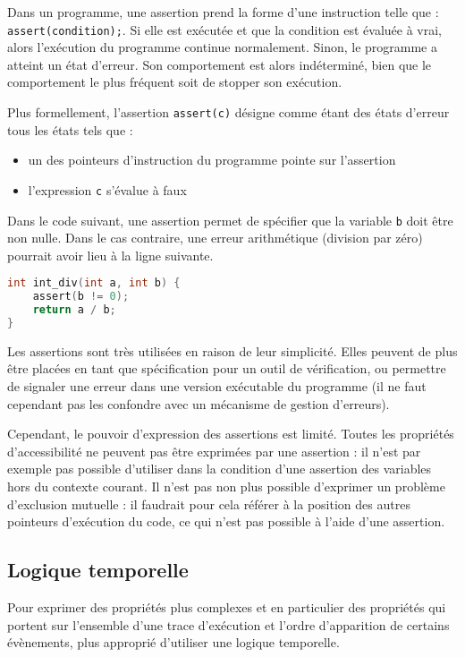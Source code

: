 Dans un programme, une assertion prend la forme d'une instruction telle que :\\
\texttt{assert(condition);}.
Si elle est exécutée et que la condition est évaluée à vrai, alors l'exécution
du programme continue normalement.
Sinon, le programme a atteint un état d'erreur. Son comportement est alors
indéterminé, bien que le comportement le plus fréquent soit de stopper son
exécution.

Plus formellement, l'assertion \texttt{assert(c)} désigne comme étant des
états d'erreur tous les états tels que :

\begin{itemize}
\item
  un des pointeurs d'instruction du programme pointe sur l'assertion
\item
  l'expression \texttt{c} s'évalue à faux
\end{itemize}

Dans le code suivant, une assertion permet de spécifier que la variable
\texttt{b} doit être non nulle. Dans le cas contraire, une erreur
arithmétique (division par zéro) pourrait avoir lieu à la ligne suivante.

\begin{lstlisting}[language=C, frame=single]
int int_div(int a, int b) {
    assert(b != 0);
    return a / b;
}
\end{lstlisting}

Les assertions sont très utilisées en raison de leur simplicité.
Elles peuvent de plus être placées en tant que spécification pour un outil de
vérification, ou permettre de signaler une erreur dans une version exécutable
du programme (il ne faut cependant pas les confondre avec un mécanisme de
gestion d'erreurs).

Cependant, le pouvoir d'expression des assertions est limité. Toutes les
propriétés d'accessibilité ne peuvent pas être exprimées par une assertion : il
n'est par exemple pas possible d'utiliser dans la condition d'une assertion des
variables hors du contexte courant. Il n'est pas non plus possible d'exprimer un
problème d'exclusion mutuelle : il faudrait pour cela référer à la position des
autres pointeurs d'exécution du code, ce qui n'est pas possible à l'aide d'une
assertion.

\subsection{Logique temporelle}

Pour exprimer des propriétés plus complexes et en particulier des propriétés qui
portent sur l'ensemble d'une trace d'exécution et l'ordre d'apparition de
certains évènements, plus approprié d'utiliser une logique temporelle.


